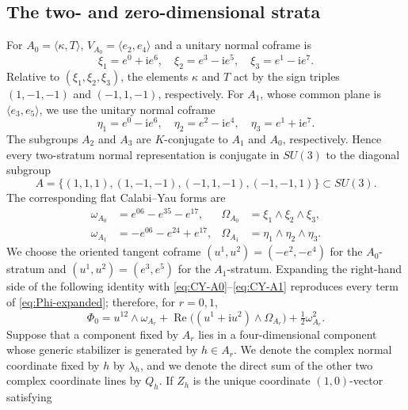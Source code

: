 \documentclass[11pt]{article}
\theoremstyle{remark}\newtheorem{remark}[theorem]{Remark}
\newcommand{\ii}{\mathrm i}
\begin{document}
\subsection{The two- and zero-dimensional strata}
For $A_0=\langle\kappa,T\rangle$, $V_{A_0}=\langle e_2,e_4\rangle$ and a
unitary normal coframe is
\begin{equation}\label{eq:SU3-coframe0}
\xi_1=e^0+\ii e^6,\quad \xi_2=e^3-\ii e^5,\quad \xi_3=e^1-\ii e^7.
\end{equation}
Relative to $(\xi_1,\xi_2,\xi_3)$, the elements $\kappa$ and $T$ act by
the sign triples $(1,-1,-1)$ and $(-1,1,-1)$, respectively.  For $A_1$,
whose common plane is $\langle e_3,e_5\rangle$, we use the unitary normal
coframe
\begin{equation}\label{eq:SU3-coframe1}
\eta_1=e^0-\ii e^6,\quad \eta_2=e^2-\ii e^4,\quad \eta_3=e^1+\ii e^7.
\end{equation}
The subgroups $A_2$ and $A_3$ are $K$-conjugate to $A_1$ and $A_0$,
respectively.  Hence every two-stratum normal representation is conjugate
in $SU(3)$ to the diagonal subgroup
\begin{equation}\label{eq:standard-A}
A=\{(1,1,1),(1,-1,-1),(-1,1,-1),(-1,-1,1)\}\subset SU(3).
\end{equation}
The corresponding flat Calabi--Yau forms are
\begin{align}
\omega_{A_0}&=e^{06}-e^{35}-e^{17},&
\Omega_{A_0}&=\xi_1\wedge\xi_2\wedge\xi_3,\label{eq:CY-A0}\\
\omega_{A_1}&=-e^{06}-e^{24}+e^{17},&
\Omega_{A_1}&=\eta_1\wedge\eta_2\wedge\eta_3.\label{eq:CY-A1}
\end{align}
We choose the oriented tangent coframe $(u^1,u^2)=(-e^2,-e^4)$ for the
$A_0$-stratum and $(u^1,u^2)=(e^3,e^5)$ for the $A_1$-stratum.  Expanding
the right-hand side of the following identity with
\eqref{eq:CY-A0}--\eqref{eq:CY-A1} reproduces every term of
\eqref{eq:Phi-expanded}; therefore, for $r=0,1$,
\begin{equation}\label{eq:flat-SU3-product}
\Phi_0=u^{12}\wedge\omega_{A_r}
 +\operatorname{Re}\bigl((u^1+\ii u^2)\wedge\Omega_{A_r}\bigr)
 +\tfrac12\omega_{A_r}^2.
\end{equation}
Suppose that a component fixed by $A_r$ lies in a four-dimensional
component whose generic stabilizer is generated by $h\in A_r$.  We denote
the complex normal coordinate fixed by $h$ by $\lambda_h$, and we denote
the direct sum of the other two complex coordinate lines by $Q_h$.  If
$Z_h$ is the unique coordinate $(1,0)$-vector satisfying
\end{document}
